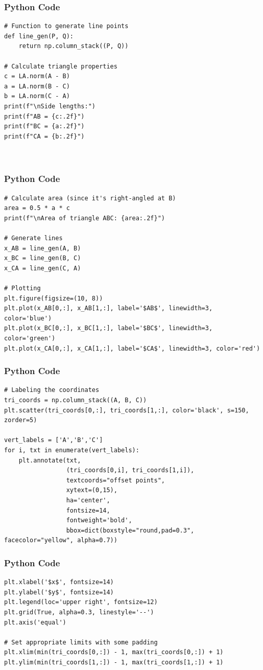 \documentclass{beamer}
\begin{document}
\begin{frame}[fragile]
    \frametitle{Python Code}
    \begin{lstlisting}
# Function to generate line points
def line_gen(P, Q):
    return np.column_stack((P, Q))

# Calculate triangle properties
c = LA.norm(A - B)
a = LA.norm(B - C)
b = LA.norm(C - A)
print(f"\nSide lengths:")
print(f"AB = {c:.2f}")
print(f"BC = {a:.2f}")
print(f"CA = {b:.2f}")



    \end{lstlisting}
\end{frame}

\begin{frame}[fragile]
    \frametitle{Python Code}
    \begin{lstlisting}
# Calculate area (since it's right-angled at B)
area = 0.5 * a * c
print(f"\nArea of triangle ABC: {area:.2f}")

# Generate lines
x_AB = line_gen(A, B)
x_BC = line_gen(B, C)
x_CA = line_gen(C, A)

# Plotting
plt.figure(figsize=(10, 8))
plt.plot(x_AB[0,:], x_AB[1,:], label='$AB$', linewidth=3, color='blue')
plt.plot(x_BC[0,:], x_BC[1,:], label='$BC$', linewidth=3, color='green')
plt.plot(x_CA[0,:], x_CA[1,:], label='$CA$', linewidth=3, color='red')

    \end{lstlisting}
\end{frame}
\begin{frame}[fragile]
    \frametitle{Python Code}
    \begin{lstlisting}
# Labeling the coordinates
tri_coords = np.column_stack((A, B, C))
plt.scatter(tri_coords[0,:], tri_coords[1,:], color='black', s=150, zorder=5)

vert_labels = ['A','B','C']
for i, txt in enumerate(vert_labels):
    plt.annotate(txt, 
                 (tri_coords[0,i], tri_coords[1,i]),
                 textcoords="offset points",
                 xytext=(0,15),
                 ha='center',
                 fontsize=14,
                 fontweight='bold',
                 bbox=dict(boxstyle="round,pad=0.3", facecolor="yellow", alpha=0.7))

    \end{lstlisting}
\end{frame}
\begin{frame}[fragile]
    \frametitle{Python Code}
    \begin{lstlisting}
plt.xlabel('$x$', fontsize=14)
plt.ylabel('$y$', fontsize=14)
plt.legend(loc='upper right', fontsize=12)
plt.grid(True, alpha=0.3, linestyle='--')
plt.axis('equal')

# Set appropriate limits with some padding
plt.xlim(min(tri_coords[0,:]) - 1, max(tri_coords[0,:]) + 1)
plt.ylim(min(tri_coords[1,:]) - 1, max(tri_coords[1,:]) + 1)
    \end{lstlisting}
\end{frame}
\end{document}
